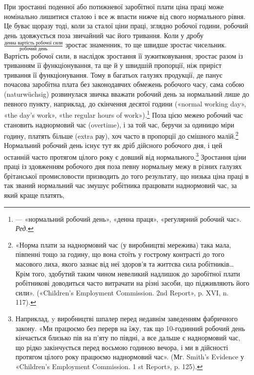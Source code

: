 При зростанні поденної або потижневої заробітної плати ціна
праці може номінально лишитися сталою і все ж впасти нижче
від свого нормального рівня. Це буває щоразу тоді, коли за сталої
ціни праці, зглядно робочої години, робочий день здовжується
поза звичайний час його тривання. Коли у дробу
$\frac{\text{денна вартість робочої сили}}{\text{робочий день}}$ зростає
знаменник, то ще швидше зростає чисельник. Вартість робочої сили, в наслідок зростання її
зужитковування, зростає разом із триванням
її функціонування, та ще й у швидшій пропорції, ніж приріст тривання її
функціонування. Тому в багатьох галузях продукції, де панує
почасова заробітна плата без законодавчих обмежень робочого
часу, сама собою (naturwüchsig) розвинулася звичка вважати
робочий день за нормальний лише до певного пункту, наприклад,
до скінчення десятої години («normal working day», «the day’s
work», «the regular hours of work»).\footnote*{
— «нормальний робочий день», «денна праця», «регулярний робочий
час». \emph{Ред.}
} Поза цією межею робочий
час становить наднормовий час (overtime), і за той час, беручи
за одиницю міри годину, платять більше (extra рау), хоч часто
в пропорції до смішного малій.\footnote{
«Норма плати за наднормовий час (у виробництві мережива) така
мала, півпенні тощо за годину, що вона стоїть у гострому контрасті до
того масового лиха, якого зазнає від неї здоров’я та життєва сила робітників\dots{}
Крім того, здобутий таким чином невеликий надлишок до заробітної
плати робітникові доводиться часто витрачати на різні засоби,
що підживляють його сили». («Children’s Employment Commission. 2nd
Report», p. XVI, n. 117).
} Нормальний робочий день
існує тут як дріб дійсного робочого дня, і цей останній часто протягом
цілого року є довший від нормального.\footnote{
Наприклад, y виробництві шпалер перед недавнім заведенням
фабричного закону. «Ми працюємо без перерв на їжу, так що 10-годинний
робочий день кінчається близько пів на п’яту по півдні, а все
дальше є наднормовий час, що рідко закінчується перед восьмою годиною
вечора, і ми в дійсності протягом цілого року працюємо наднормовий
час». (Мг. Smith’s Evidence у «Children’s Employment Commission.
1 st Report», p. 125).
} Зростання ціни
праці із здовженням робочого дня поза певну нормальну межу
в різних галузях брітанської промисловости призводить до того
результату, що низька ціна праці в так званий нормальний час змушує
робітника працювати наднормовий час, за який краще платять,
